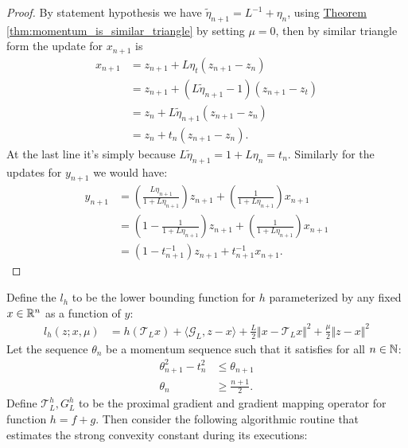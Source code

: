 \documentclass[12pt]{article}
\begin{document}
        \begin{proof}
            By statement hypothesis we have $\tilde \eta_{n + 1} = L^{-1} + \eta_n$, using 
            \hyperref[thm:momentum_is_similar_triangle]
            {Theorem \ref*{thm:momentum_is_similar_triangle}}
            by setting $\mu = 0$, then by similar triangle form the update for $x_{n + 1}$ is 
            \begin{align*}
                x_{n + 1} &= z_{n + 1} + L\eta_t(z_{n +1} - z_n)
                \\
                &= z_{n + 1} + (L\tilde \eta_{n + 1} - 1)(z_{n + 1} - z_t)
                \\
                &= z_n + L\tilde \eta_{n + 1}(z_{n + 1} - z_n)
                \\
                &= z_n + t_n(z_{n + 1} - z_n).
            \end{align*}
            At the last line it's simply because $L\tilde \eta_{n + 1} = 1 + L\eta_n = t_n$. 
            Similarly for the updates for $y_{n + 1}$ we would have: 
            \begin{align*}
                y_{n + 1} &= \left(
                    \frac{L\eta_{n + 1}}{1 + L \eta_{n + 1}}
                \right)z_{n + 1} + 
                \left(
                    \frac{1}{1 + L \eta_{n + 1}}
                \right) x_{n + 1}
                \\
                &= 
                \left(
                    1 - \frac{1}{1 + L\eta_{n + 1}}
                \right)z_{n + 1} + 
                \left(
                    \frac{1}{1 + L \eta_{n + 1}}
                \right)x_{n + 1}
                \\
                &= (1 - t_{n + 1}^{-1})z_{n + 1} + t_{n + 1}^{-1}x_{n + 1}. 
            \end{align*}

        \end{proof}
        \par
        Define the $l_h$ to be the lower bounding function for $h$ parameterized by any fixed $x\in \mathbb R^n$ as a function of $y$: 
        \begin{align*}
            l_h(z; x, \mu)&=  h(\mathcal T_Lx) + \langle \mathcal G_L, z- x\rangle + \frac{L}{2}\Vert x - \mathcal T_Lx\Vert^2 + 
            \frac{\mu}{2}\Vert z - x\Vert^2
        \end{align*}
        Let the sequence $\theta_n$ be a momentum sequence such that it satisfies for all $n\in \mathbb N$: 
        \begin{align*}
            \theta_{n + 1}^2 - t_n^2 
            &\le \theta_{n + 1}
            \\
            \theta_n &\ge \frac{n + 1}{2}.
        \end{align*}
        Define $\mathcal T_L^{h}, G_L^h$ to be the proximal gradient and gradient mapping operator for function $h = f + g$. 
        Then consider the following algorithmic routine that estimates the strong convexity constant during its executions: 
        
\end{document}
